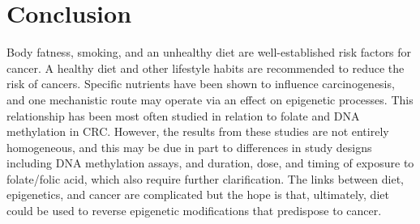  
\section[]{Conclusion} %
\noindent Body fatness, smoking, and an unhealthy diet are well-established risk factors for cancer. A healthy diet and other lifestyle habits are recommended to reduce the risk of cancers. Specific nutrients have been shown to influence carcinogenesis, and one mechanistic route may operate via an effect on epigenetic processes. This relationship has been most often studied in relation to folate and DNA methylation in CRC. However, the results from these studies are not entirely homogeneous, and this may be due in part to differences in study designs including DNA methylation assays, and duration, dose, and timing of exposure to folate/folic acid, which also require further clarification. The links between diet, epigenetics, and cancer are complicated but the hope is that, ultimately, diet could be used to reverse epigenetic modifications that predispose to cancer. 
 
